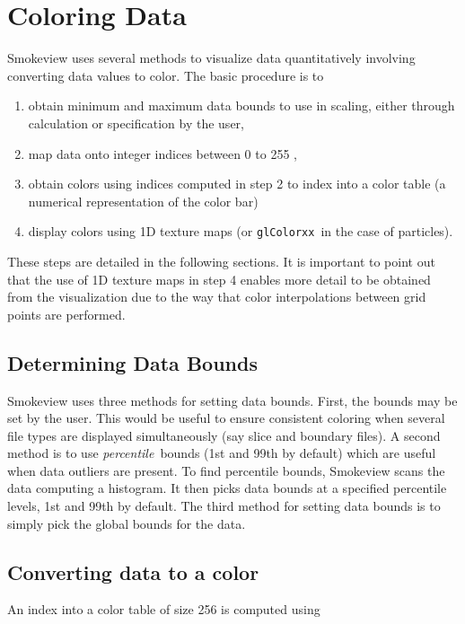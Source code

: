 \documentclass[11pt,twoside]{book}
\begin{document}
%
%

\section{Coloring Data}
Smokeview uses several methods to visualize data quantitatively
involving converting data values to color. The basic procedure is
to
\begin{enumerate}
\item obtain minimum and maximum data bounds to use in scaling,
either through calculation or specification by the user,

\item map data onto integer indices between 0 to 255 ,

\item obtain colors using indices computed in step 2 to index into
a color table (a numerical representation of the color bar)

\item display colors using 1D texture maps (or {\tt glColorxx}\ in
the case of particles).
\end{enumerate}
These steps are detailed in the following sections.   It is
important to point out that the use of 1D texture maps in step 4
enables more detail to be obtained from the visualization due to
the way that color interpolations between grid points are
performed.

\subsection{Determining Data Bounds}Smokeview uses three methods for
setting data bounds.  First, the bounds may be set by the user.
This would be useful to ensure consistent coloring when several
file types are displayed simultaneously (say slice and boundary files).
A second method is to use {\em percentile}\ bounds (1st and 99th by default)
which are useful when data outliers are present.  To find percentile bounds,
Smokeview scans the data computing a histogram.  It then picks data bounds at
a specified percentile levels, 1st and 99th by default.  The third method for
setting data bounds is to simply pick the global bounds for the data.

\subsection{Converting data to a color}
An index into a color table of size 256 is computed using
\end{document}
